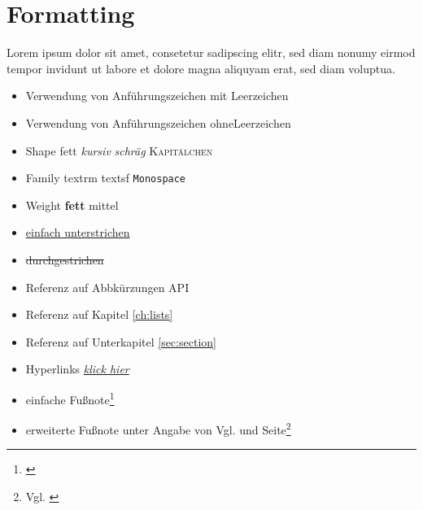 \section{Formatting}
\label{sec:formatting}

	Lorem ipsum dolor sit amet, consetetur sadipscing elitr, sed diam nonumy eirmod tempor invidunt ut labore et dolore magna aliquyam erat, sed diam voluptua.
	
	\begin{itemize}
		\item{Verwendung von Anführungszeichen \glqq{}mit\grqq{} Leerzeichen}
		\item{Verwendung von Anführungszeichen \glqq ohne\grqq Leerzeichen}
		\item{Shape \textup{fett} \textit{kursiv} \textsl{schräg} \textsc{Kapitälchen}}
		\item{Family \textrm{textrm} \textsf{textsf}  \texttt{Monospace}}
		\item{Weight \textbf{fett} \textmd{mittel}}
		\item{\uline{einfach unterstrichen} }
		\item{ \sout{durchgestrichen} }
		\item{Referenz auf Abbkürzungen \ac{API}}
		\item{Referenz auf Kapitel \ref{ch:lists}}
		\item{Referenz auf Unterkapitel \ref{sec:section}}
		\item{Hyperlinks \href{https://google.com}{\textit{klick hier}}}
		\item{einfache Fußnote\footnote{\cite{Linz.2013}}}
		\item{erweiterte Fußnote unter Angabe von \glqq{}Vgl.\grqq{} und Seite\footnote{Vgl. \cite[S. 11f]{Linz.2013}}}
	\end{itemize}